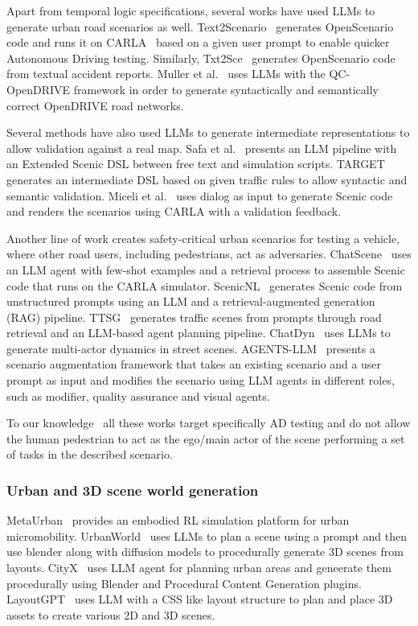 \documentclass[preprint,12pt]{elsarticle}
\begin{document}
Apart from temporal logic specifications, several works have used LLMs to generate urban road scenarios as well. Text2Scenario~\cite{todo cite text2scenario} generates OpenScenario code and runs it on CARLA~\cite{todo cite carla} based on a given user prompt to enable quicker Autonomous Driving testing. Similarly, Txt2Sce~\cite{txt2sce2025} generates OpenScenario code from textual accident reports. Muller et al.~\cite{muller2025qcopendrive} uses LLMs with the QC-OpenDRIVE framework in order to generate syntactically and semantically correct OpenDRIVE road networks. 

Several methods have also used LLMs to generate intermediate representations to allow validation against a real map. Safa et al.~\cite{safa2026extendedscenic} presents an LLM pipeline with an Extended Scenic DSL between free text and simulation scripts. TARGET~\cite{target2023} generates an intermediate DSL based on given traffic rules to allow  syntactic and semantic validation. Miceli et al.~\cite{miceli2023dialogue} uses dialog as input to generate Scenic code and renders the scenarios using CARLA with a validation feedback.

Another line of work creates safety-critical urban scenarios for testing a vehicle, where other road users, including pedestrians, act as adversaries. ChatScene~\cite{zhang2024chatscene} uses an LLM agent with few-shot examples and a retrieval process to assemble Scenic code that runs on the CARLA simulator. ScenicNL~\cite{elmaaroufi2024scenicnl} generates Scenic code from unstructured prompts using an LLM and a retrieval-augmented generation (RAG) pipeline. TTSG~\cite{ruan2024ttsg} generates traffic scenes from prompts through road retrieval and an LLM-based agent planning pipeline. ChatDyn~\cite{chatdyn2024} uses LLMs to generate multi-actor dynamics in street scenes. AGENTS-LLM~\cite{yao2025agentsllm} presents a scenario augmentation framework that takes an existing scenario and a user prompt as input and modifies the scenario using LLM agents in different roles, such as modifier, quality assurance and visual agents.

To our knowledge~\cite{zhao2025llmsurvey, zhou2025genaisurvey} all these works target specifically AD testing and do not allow the human pedestrian to act as the ego/main actor of the scene performing a set of tasks in the described scenario. 


\subsubsection{Urban and 3D scene world generation}
MetaUrban~\cite{wu2025metaurban} provides an embodied RL simulation platform for urban micromobility. UrbanWorld~\cite{shang2024urbanworld} uses LLMs to plan a scene using a prompt and then use blender along with diffusion models to procedurally generate 3D scenes from layouts. CityX~\cite{zhang2024cityx} uses LLM agent for planning urban areas and geneerate them procedurally using Blender and Procedural Content Generation plugins. LayoutGPT~\cite{feng2023layoutgpt} uses LLM with a CSS like layout structure to plan and place 3D assets to create various 2D and 3D scenes.
\end{document}
